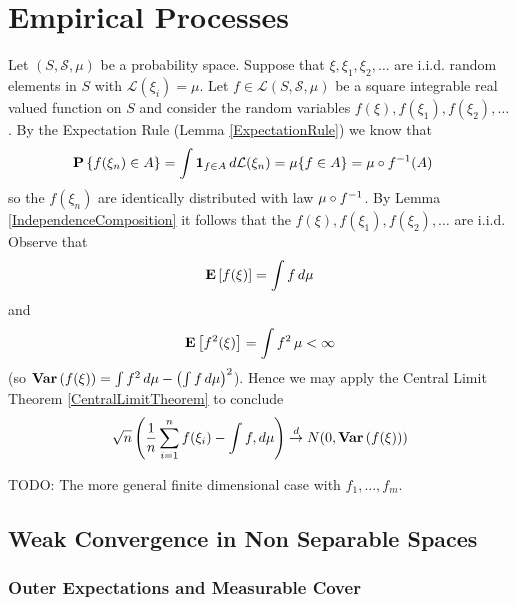 \chapter{Empirical Processes}

Let $(S, \mathcal{S}, \mu)$ be a probability space.  Suppose that $\xi, \xi_1, \xi_2, \dotsc$ are i.i.d. random elements in $S$ with $\mathcal{L}(\xi_i) = \mu$.  Let $f \in \mathcal{L}(S, \mathcal{S}, \mu)$ be a square integrable real valued function on $S$ and consider the random variables $f(\xi), f(\xi_1), f(\xi_2), \dotsc$.  By the Expectation Rule (Lemma \ref{ExpectationRule}) we know that 
\begin{align*}
\textbf{P}\left \{f(\xi_n) \in A \right \} &= \int \textbf{1}_{f \in A} \, d\mathcal{L}(\xi_n) = \mu \lbrace f \in A \rbrace = \mu \circ f^{-1}(A)
\end{align*}
so the $f(\xi_n)$ are identically distributed with law $\mu \circ f^{-1}$.  By Lemma \ref{IndependenceComposition} it follows that the $f(\xi), f(\xi_1), f(\xi_2), \dotsc$ are i.i.d.  Observe that 
\begin{align*}
\textbf{E}\left[f(\xi)\right] = \int f \, d\mu 
\end{align*}
and 
\begin{align*}
\textbf{E}\left[f^2(\xi)\right] = \int f^2 \, \mu < \infty
\end{align*}
(so $\textbf{Var} \left (f(\xi) \right ) = \int f^2 \, d\mu - \left(\int f \, d\mu\right)^2$).  Hence we may apply the Central Limit Theorem \ref{CentralLimitTheorem} to conclude 
\begin{align*}
\sqrt{n} \left( \frac{1}{n} \sum_{i=1}^n f(\xi_i) - \int f , d\mu \right) \overset{d}\to N(0, \textbf{Var} \left (f(\xi) \right ) )
\end{align*}

TODO: The more general finite dimensional case with $f_1, \dotsc, f_m$.

\section{Weak Convergence in Non Separable Spaces}

\subsection{Outer Expectations and Measurable Cover}

